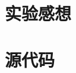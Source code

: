 \documentclass{article}
\begin{document}
\section{实验感想}

\newpage
\appendix
\section{源代码}
\end{document}

